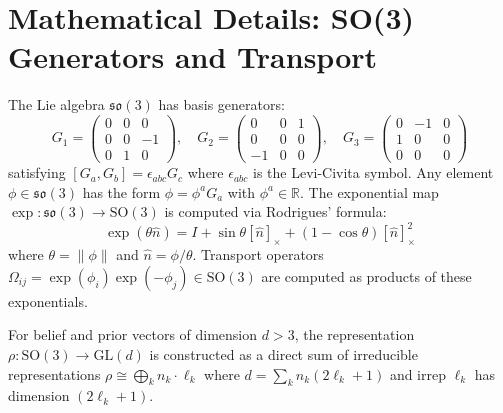\documentclass[11pt]{article}
\begin{document}
\section{Mathematical Details: SO(3) Generators and Transport}
\label{app:so3}

The Lie algebra $\mathfrak{so}(3)$ has basis generators:
\begin{equation}
G_1 = \begin{pmatrix} 0 & 0 & 0 \\ 0 & 0 & -1 \\ 0 & 1 & 0 \end{pmatrix}, \quad
G_2 = \begin{pmatrix} 0 & 0 & 1 \\ 0 & 0 & 0 \\ -1 & 0 & 0 \end{pmatrix}, \quad
G_3 = \begin{pmatrix} 0 & -1 & 0 \\ 1 & 0 & 0 \\ 0 & 0 & 0 \end{pmatrix}
\end{equation}
satisfying $[G_a, G_b] = \epsilon_{abc} G_c$ where $\epsilon_{abc}$ is the Levi-Civita symbol. Any element $\phi \in \mathfrak{so}(3)$ has the form $\phi = \phi^a G_a$ with $\phi^a \in \mathbb{R}$. The exponential map $\exp: \mathfrak{so}(3) \to \mathrm{SO}(3)$ is computed via Rodrigues' formula:
\begin{equation}
\exp(\theta \hat{n}) = I + \sin\theta [\hat{n}]_\times + (1 - \cos\theta)[\hat{n}]_\times^2
\end{equation}
where $\theta = \|\phi\|$ and $\hat{n} = \phi/\theta$. Transport operators $\Omega_{ij} = \exp(\phi_i)\exp(-\phi_j) \in \mathrm{SO}(3)$ are computed as products of these exponentials.

For belief and prior vectors of dimension $d > 3$, the representation $\rho: \mathrm{SO}(3) \to \mathrm{GL}(d)$ is constructed as a direct sum of irreducible representations $\rho \cong \bigoplus_k n_k \cdot \ell_k$ where $d = \sum_k n_k(2\ell_k + 1)$ and irrep $\ell_k$ has dimension $(2\ell_k + 1)$.



\end{document}
